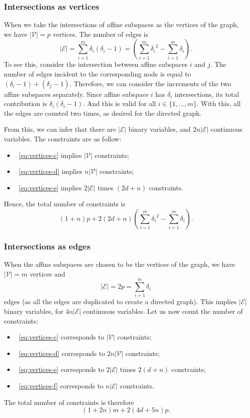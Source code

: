 \documentclass[a4paper, 12pt]{article}
\begin{document}
\subsubsection{Intersections as vertices}
When we take the intersections of affine subspaces as the vertices of the graph, we have $|\mathcal{V}| = p$ vertices. The number of edges is \[|\mathcal{E}| = \sum_{i=1}^m \delta_i (\delta_i - 1) = \left(\sum_{i=1}^m {\delta_i}^2 - \sum_{i=1}^m \delta_i\right).\] To see this, consider the intersection between affine subspaces $i$ and $j$. The number of edges incident to the corresponding node is equal to $(\delta_i - 1) + (\delta_j - 1)$. Therefore, we can consider the increments of the two affine subspaces separately. Since affine subspace $i$ has $\delta_i$ intersections, its total contribution is $\delta_i (\delta_i - 1)$. And this is valid for all $i \in \{1, \dots, m\}$. With this, all the edges are counted two times, as desired for the directed graph.

From this, we can infer that there are $|\mathcal{E}|$ binary variables, and $2n|\mathcal{E}|$ continuous variables. The constraints are as follow:
\begin{itemize}[label={}, leftmargin=0.5cm]
    \item~\ref{eq:vertices-c} implies $|\mathcal{V}|$        constraints;
    \item~\ref{eq:vertices-d} implies $n|\mathcal{V}|$       constraints;
    \item~\ref{eq:vertices-e} implies $2|\mathcal{E}|$ times $(2d+n)$ constraints.
\end{itemize}
Hence, the total number of constraints is \[(1+n)p + 2(2d+n) \left(\sum_{i=1}^m {\delta_i}^2 - \sum_{i=1}^m \delta_i\right).\]

\subsubsection{Intersections as edges}
When the affine subspaces are chosen to be the vertices of the graph, we have $|\mathcal{V}| = m$ vertices and \[|\mathcal{E}| = 2p = \sum_{i=1}^{m} \delta_i\] edges (as all the edges are duplicated to create a directed graph). This implies $|\mathcal{E}|$ binary variables, for $4n|\mathcal{E}|$ continuous variables. Let us now count the number of constraints:
\begin{itemize}[label={}, leftmargin=0.5cm]
    \item~\ref{eq:vertices-c} corresponds to $|\mathcal{V}|$   constraints;
    \item~\ref{eq:vertices-d} corresponds to $2n|\mathcal{V}|$ constraints;
    \item~\ref{eq:vertices-e} corresponds to $2|\mathcal{E}|$ times $2(d+n)$ constraints;
    \item~\ref{eq:vertices-f} corresponds to $n|\mathcal{E}|$  constraints.
\end{itemize}
The total number of constraints is therefore \[(1+2n)m + 2(4d+5n)p.\]
\end{document}
